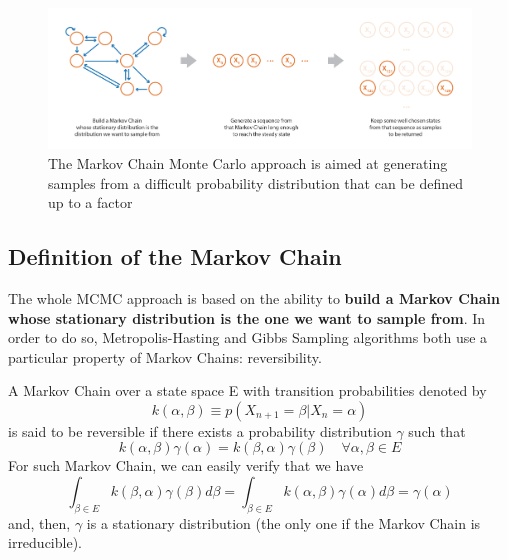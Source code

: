 \begin{figure}[h]
    \centering
\includegraphics[width=\textwidth]{pic/p05c07-snip04.png}
    \caption[The Markov Chain Monte Carlo approach is aimed at generating samples]{The Markov Chain Monte Carlo approach is aimed at generating samples from a difficult probability distribution that can be defined up to a factor}
    \label{fig:p05c07-snip04}
\end{figure}


\subsection{Definition of the Markov Chain}

The whole MCMC approach is based on the ability to \textbf{build a Markov Chain whose stationary distribution is the one we want to sample from}. In order to do so, Metropolis-Hasting and Gibbs Sampling algorithms both use a particular property of Markov Chains: reversibility.

A Markov Chain over a state space E with transition probabilities denoted by
\begin{equation}k(\alpha, \beta) \equiv p\left(X_{n+1}=\beta | X_{n}=\alpha\right)\end{equation}
is said to be reversible if there exists a probability distribution $\gamma$ such that
\begin{equation}k(\alpha, \beta) \gamma(\alpha)=k(\beta, \alpha) \gamma(\beta) \quad \forall \alpha, \beta \in E\end{equation}
For such Markov Chain, we can easily verify that we have
\begin{equation}\int_{\beta \in E} k(\beta, \alpha) \gamma(\beta) d \beta=\int_{\beta \in E} k(\alpha, \beta) \gamma(\alpha) d \beta=\gamma(\alpha)\end{equation}
and, then, $\gamma$ is a stationary distribution (the only one if the Markov Chain is irreducible).

